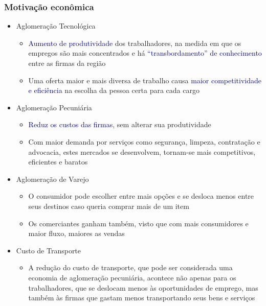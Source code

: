 \documentclass[%
    8pt, 
    aspectratio=169,
]{beamer}
\begin{document}
\begin{frame}
    \frametitle{Motivação econômica \cite{brueckner2011lectures}}
    \begin{itemize}
        \item<1-> Aglomeração Tecnológica
        \begin{itemize}
            \item<1> \textcolor{DarkBlue}{Aumento de produtividade} dos trabalhadores, na medida em que os empregos são mais concentrados e há \textcolor{DarkBlue}{``transbordamento'' de conhecimento} entre as firmas da região
            \item<1> Uma oferta maior e mais diversa de trabalho causa \textcolor{DarkBlue}{maior competitividade e eficiência} na escolha da pessoa certa para cada cargo
        \end{itemize}
        \item<2-> Aglomeração Pecuniária
        \begin{itemize}
            \item<2> \textcolor{DarkBlue}{Reduz os custos das firmas}, sem alterar sua produtividade
            \item<2> Com maior demanda por serviços como segurança, limpeza, contratação e advocacia, estes mercados se desenvolvem, tornam-se mais competitivos, eficientes e baratos
        \end{itemize}
        \item<3-> Aglomeração de Varejo
        \begin{itemize}
            \item<3> O consumidor pode escolher entre mais opções e se desloca menos entre seus destinos caso queria comprar mais de um item
            \item<3> Os comerciantes ganham também, visto que com mais consumidores e maior fluxo, maiores as vendas
        \end{itemize}
        \item<4-> Custo de Transporte
        \begin{itemize}
            \item<4> A redução do custo de transporte, que pode ser considerada uma economia de aglomeração pecuniária, acontece não apenas para os trabalhadores, que se deslocam menos às oportunidades de emprego, mas também às firmas que gastam menos transportando seus bens e serviços
        \end{itemize}
    \end{itemize}

\end{frame}
\end{document}
